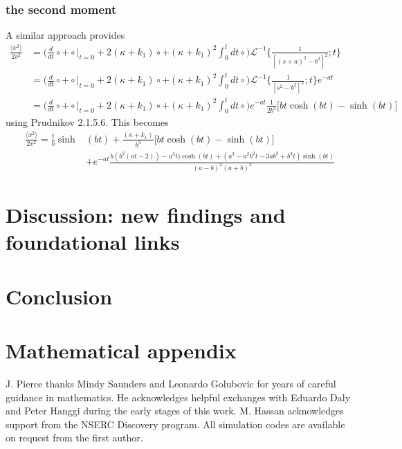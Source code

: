 \documentclass[]{agujournal2018}
\newcommand\bra{\langle}
\newcommand\ket{\rangle}
\newcommand\El{\mathcal{L}}
\begin{document}
\subsubsection{the second moment}
A similar approach provides 
\begin{align}
\frac{\bra x^2 \ket}{2v^2} &= \Big(\frac{d}{dt}\circ + \circ \Big|_{t=0} + 2(\kappa + k_1)\circ + (\kappa+k_1)^2\int_0^t dt \circ \Big)\El^{-1}\Big\{\frac{1}{[(s+a)^2-b^2]^2};t\Big\}\\
&= \Big(\frac{d}{dt}\circ + \circ \Big|_{t=0} + 2(\kappa + k_1)\circ + (\kappa+k_1)^2\int_0^t dt \circ \Big)\El^{-1}\Big\{\frac{1}{[s^2-b^2]^2};t\Big\}e^{-at}\\
&= \Big(\frac{d}{dt}\circ + \circ \Big|_{t=0} + 2(\kappa + k_1)\circ + (\kappa+k_1)^2\int_0^t dt \circ \Big)e^{-at}\frac{1}{2b^3}\Big[bt\cosh(bt)-\sinh(bt)\Big]
\end{align}
using Prudnikov 2.1.5.6.
This becomes
\begin{align}
\frac{\bra x^2 \ket}{2v^2} = \frac{t}{b}\sinh&(bt) + \frac{(\kappa + k_1)}{b^3}\big[bt\cosh(bt)-\sinh(bt)\big]\\
&+e^{-at}\frac{b(b^2(at-2))-a^3t)\cosh(bt) +(a^3-a^2b^2t-3ab^2+b^4t)\sinh(bt)}{(a-b)^2(a+b)^2}
\end{align}


\section{Discussion: new findings and foundational links}
\section{Conclusion}


\appendix
\section{Mathematical appendix}

\acknowledgments
J. Pierce thanks Mindy Saunders  and Leonardo Golubovic for years of careful guidance in mathematics. He acknowledges helpful exchanges with Eduardo Daly and Peter Hanggi during the early stages of this work. M. Hassan acknowledges support from the NSERC Discovery program. All simulation codes are available on request from the first author.


\end{document}
